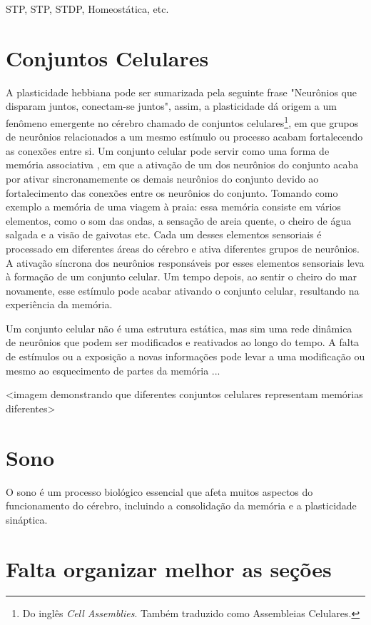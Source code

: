 STP, STP, STDP, Homeostática, etc.

\section{Conjuntos Celulares}

A plasticidade hebbiana pode ser sumarizada pela seguinte frase "Neurônios que disparam juntos, conectam-se juntos", assim, a
plasticidade dá origem a um fenômeno emergente no cérebro chamado de conjuntos celulares\footnote{Do inglês \textit{Cell
Assemblies}. Também traduzido como Assembleias Celulares.}, em que grupos de neurônios relacionados a um mesmo estímulo ou
processo acabam fortalecendo as conexões entre si. Um conjunto celular pode servir como uma forma de memória associativa
\cite{sakuraiMultiple2018}, em que a ativação de um dos neurônios do conjunto acaba por ativar sincronamemente os demais neurônios
do conjunto devido ao fortalecimento das conexões entre os neurônios do conjunto. Tomando como exemplo a memória de uma viagem à
praia: essa memória consiste em vários elementos, como o som das ondas, a sensação de areia quente, o cheiro de água salgada e a
visão de gaivotas etc. Cada um desses elementos sensoriais é processado em diferentes áreas do cérebro e ativa diferentes grupos
de neurônios. A ativação síncrona dos neurônios responsáveis por esses elementos sensoriais leva à formação de um conjunto
celular. Um tempo depois, ao sentir o cheiro do mar novamente, esse estímulo pode acabar ativando o conjunto celular, resultando
na experiência da memória.

Um conjunto celular não é uma estrutura estática, mas sim uma rede dinâmica de neurônios que podem ser modificados e reativados ao
longo do tempo. A falta de estímulos ou a exposição a novas informações pode levar a uma modificação ou mesmo ao esquecimento de
partes da memória {...} 

<imagem demonstrando que diferentes conjuntos celulares representam memórias diferentes>


\section{Sono}

O sono é um processo biológico essencial que afeta muitos aspectos do funcionamento do cérebro, incluindo a consolidação da
memória e a plasticidade sináptica.

\section{Falta organizar melhor as seções}